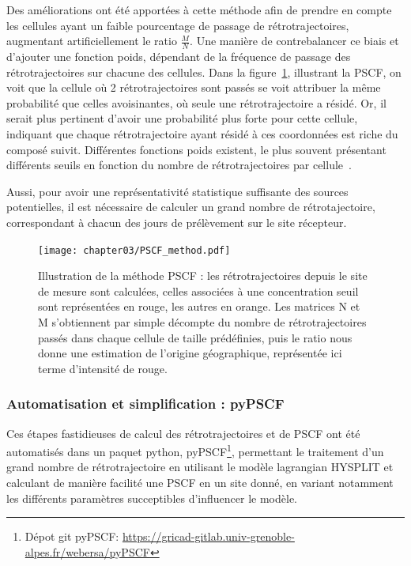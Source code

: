 Des améliorations ont été apportées à cette méthode afin de prendre en compte les cellules
ayant un faible pourcentage de passage de rétrotrajectoires, augmentant artificiellement
le ratio $\frac{M}{N}$. Une manière de contrebalancer ce biais et d'ajouter une fonction
poids, dépendant de la fréquence de passage des rétrotrajectoires sur chacune des
cellules. Dans la figure~\ref{fig:chapter02/PSCF_method}, illustrant la PSCF, on voit que
la cellule où 2 rétrotrajectoires sont passés se voit attribuer la même probabilité que
celles avoisinantes, où seule une rétrotrajectoire a résidé. Or, il serait plus pertinent
d'avoir une probabilité plus forte pour cette cellule, indiquant que chaque
rétrotrajectoire ayant résidé à ces coordonnées est riche du composé suivit.  Différentes
fonctions poids existent, le plus souvent présentant différents seuils en fonction du
nombre de rétrotrajectoires par cellule~\autocite{bressiSources2014,petitSources2019}.

Aussi, pour avoir une représentativité statistique suffisante des sources potentielles, il
est nécessaire de calculer un grand nombre de rétrotajectoire, correspondant à chacun des
jours de prélèvement sur le site récepteur.


\begin{figure}[ht]
    \centering
    \texttt{[image: chapter03/PSCF\_method.pdf]}
    \caption{Illustration de la méthode PSCF : les rétrotrajectoires depuis le site de
        mesure sont calculées, celles associées à une concentration seuil sont
        représentées en rouge, les autres en orange. Les matrices N et M s'obtiennent par
        simple décompte du nombre de rétrotrajectoires passés dans chaque cellule de
        taille prédéfinies, puis le ratio nous donne une estimation de l'origine
    géographique, représentée ici terme d'intensité de rouge.}%
    \label{fig:chapter02/PSCF_method}
\end{figure}

\subsubsection{Automatisation et simplification : pyPSCF}%
\label{ssub:automatisation_et_simplification_pypscf}

Ces étapes fastidieuses de calcul des rétrotrajectoires et de PSCF ont été automatisés
dans un paquet python, pyPSCF\footnote{Dépot git pyPSCF:
\url{https://gricad-gitlab.univ-grenoble-alpes.fr/webersa/pyPSCF}}, permettant le
traitement d'un grand nombre de rétrotrajectoire en utilisant le modèle lagrangian
HYSPLIT et calculant de manière facilité une PSCF en un site donné, en variant notamment
les différents paramètres succeptibles d'influencer le modèle.

